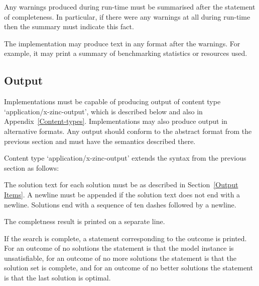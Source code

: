 \documentclass[10pt]{scrartcl}
\newcommand{\pjs}[1]{\textcolor{blue}{PJS:#1}}
\begin{document}
Any warnings produced during run-time must be summarised
after the statement of completeness.
In particular, if there were any warnings at all during run-time
then the summary must indicate this fact.

The implementation may produce text in any format after the warnings.
For example, it may print
a summary of benchmarking statistics or resources used.

\subsection{Output}
  \label{Output}
Implementations must be capable of producing output of content type
`application/x-zinc-output',
which is described below and also in Appendix~\ref{Content-types}.
Implementations may also produce output in alternative formats.
Any output should conform to
the abstract format from the previous section
and must have the semantics described there.

Content type `application/x-zinc-output' extends
the syntax from the previous section as follows:

\begin{productions}
\RuleSolution
\end{productions}

\noindent

The solution text for each solution must be
as described in Section~\ref{Output Items}.
A newline must be appended if the solution text does not end with a newline.
Solutions end with a sequence of ten dashes followed by a newline.

\begin{productions}
\RuleOutcomeStrings
\end{productions}

\noindent
The completness result is printed on a separate line.

\begin{productions}
\RuleComplete
\end{productions}

\noindent
If the search is complete, a statement corresponding to the outcome is printed.
For an outcome of no solutions
the statement is that the model instance is unsatisfiable,
for an outcome of no more solutions
the statement is that the solution set is complete,
and for an outcome of no better solutions
the statement is that the last solution is optimal.
\end{document}
